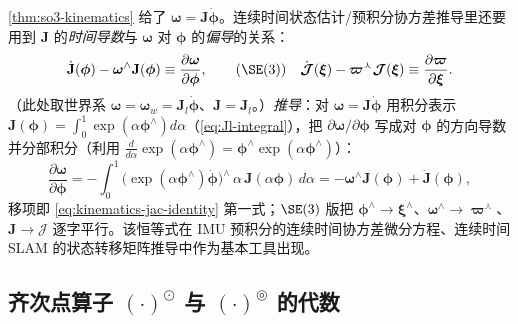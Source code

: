 \begin{derivation}[运动学雅可比恒等式 $\dot{\mathbf{J}}-\boldsymbol{\omega}^\wedge\mathbf{J}=\partial\boldsymbol{\omega}/\partial\boldsymbol{\phi}$]
\cref{thm:so3-kinematics} 给了 $\boldsymbol{\omega}=\mathbf{J}\dot{\boldsymbol{\phi}}$。连续时间状态估计/预积分协方差推导里还要用到 $\mathbf{J}$ 的\emph{时间导数}与 $\boldsymbol{\omega}$ 对 $\boldsymbol{\phi}$ 的\emph{偏导}的关系\cite{barfoot2024state}：
\begin{equation}
  \dot{\mathbf{J}}(\boldsymbol{\phi})-\boldsymbol{\omega}^\wedge\mathbf{J}(\boldsymbol{\phi})\equiv\frac{\partial\boldsymbol{\omega}}{\partial\boldsymbol{\phi}},\qquad(\SE(3))\quad\dot{\boldsymbol{\mathcal{J}}}(\boldsymbol{\xi})-\boldsymbol{\varpi}^\curlywedge\boldsymbol{\mathcal{J}}(\boldsymbol{\xi})\equiv\frac{\partial\boldsymbol{\varpi}}{\partial\boldsymbol{\xi}}.
  \label{eq:kinematics-jac-identity}
\end{equation}
（此处取世界系 $\boldsymbol{\omega}=\boldsymbol{\omega}_w=\mathbf{J}_l\dot{\boldsymbol{\phi}}$、$\mathbf{J}=\mathbf{J}_l$。）\emph{推导}：对 $\boldsymbol{\omega}=\mathbf{J}\dot{\boldsymbol{\phi}}$ 用积分表示 $\mathbf{J}(\boldsymbol{\phi})=\int_0^1\exp(\alpha\boldsymbol{\phi}^\wedge)d\alpha$（\cref{eq:Jl-integral}），把 $\partial\boldsymbol{\omega}/\partial\boldsymbol{\phi}$ 写成对 $\boldsymbol{\phi}$ 的方向导数并分部积分（利用 $\tfrac{d}{d\alpha}\exp(\alpha\boldsymbol{\phi}^\wedge)=\boldsymbol{\phi}^\wedge\exp(\alpha\boldsymbol{\phi}^\wedge)$）：
\[
  \frac{\partial\boldsymbol{\omega}}{\partial\boldsymbol{\phi}}
  =-\int_0^1\big(\exp(\alpha\boldsymbol{\phi}^\wedge)\dot{\boldsymbol{\phi}}\big)^\wedge\,\alpha\,\mathbf{J}(\alpha\boldsymbol{\phi})\,d\alpha
  =-\boldsymbol{\omega}^\wedge\mathbf{J}(\boldsymbol{\phi})+\dot{\mathbf{J}}(\boldsymbol{\phi}),
\]
移项即 \cref{eq:kinematics-jac-identity} 第一式；$\SE(3)$ 版把 $\boldsymbol{\phi}^\wedge\to\boldsymbol{\xi}^\wedge$、$\boldsymbol{\omega}^\wedge\to\boldsymbol{\varpi}^\curlywedge$、$\mathbf{J}\to\boldsymbol{\mathcal{J}}$ 逐字平行。该恒等式在 IMU 预积分的连续时间协方差微分方程、连续时间 SLAM 的状态转移矩阵推导中作为基本工具出现。
\end{derivation}

\subsection{齐次点算子 \texorpdfstring{$(\cdot)^\odot$}{odot} 与 \texorpdfstring{$(\cdot)^\circledcirc$}{circledcirc} 的代数}
\label{subsec:odot-algebra}

